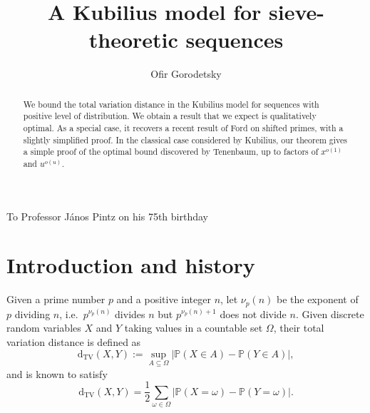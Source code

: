 \documentclass{article}
\title{A Kubilius model for sieve-theoretic sequences}
\author{Ofir Gorodetsky}
\date{}
\theoremstyle{plain}
\theoremstyle{remark}
\newcommand{\PP}{\mathbb{P}}
\newcommand{\dtv}{\mathrm{d}_{\mathrm{TV}}}
\numberwithin{equation}{section}
\begin{document}
\maketitle


{\centering To Professor J\'anos Pintz on his 75th birthday\par}
\begin{abstract}
We bound the total variation distance in the Kubilius model for sequences with positive level of distribution. We obtain a result that we expect is qualitatively optimal. As a special case, it recovers a recent result of Ford on shifted primes, with a slightly simplified proof. In the classical case considered by Kubilius, our theorem gives a simple proof of the optimal bound discovered by Tenenbaum, up to factors of $x^{o(1)}$ and $u^{o(u)}$. 
\end{abstract}
\section{Introduction and history}
Given a prime number $p$ and a positive integer $n$, let $\nu_p(n)$ be the exponent of $p$ dividing $n$, i.e.~$p^{\nu_p(n)}$ divides $n$ but $p^{\nu_p(n)+1}$ does not divide $n$. Given discrete random variables $X$ and $Y$ taking values in a countable set $\Omega$, their total variation distance is defined as
\[ \dtv(X,Y) := \sup_{A\subseteq \Omega} |\PP(X\in A)-\PP(Y\in A)|,\]
and is known to satisfy \cite[Eq.~(3.7)]{ABT}
\begin{equation}\label{eq:dtv1} 
	\dtv(X,Y) = \frac{1}{2}\sum_{\omega \in\Omega} |\PP(X=\omega)-\PP(Y=\omega)|.
\end{equation}
\end{document}
